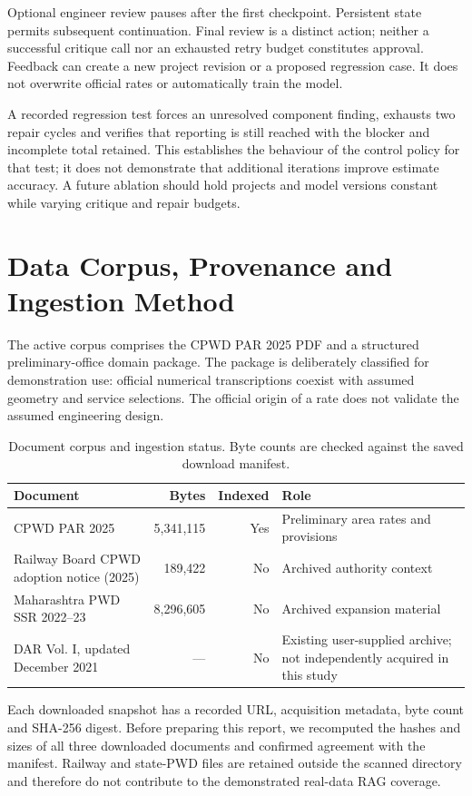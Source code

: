 \documentclass[11pt,a4paper]{article}
\begin{document}
Optional engineer review pauses after the first checkpoint. Persistent state permits subsequent continuation. Final review is a distinct action; neither a successful critique call nor an exhausted retry budget constitutes approval. Feedback can create a new project revision or a proposed regression case. It does not overwrite official rates or automatically train the model.

A recorded regression test forces an unresolved component finding, exhausts two repair cycles and verifies that reporting is still reached with the blocker and incomplete total retained. This establishes the behaviour of the control policy for that test; it does not demonstrate that additional iterations improve estimate accuracy. A future ablation should hold projects and model versions constant while varying critique and repair budgets.

\section{Data Corpus, Provenance and Ingestion Method}
The active corpus comprises the CPWD PAR 2025 PDF and a structured preliminary-office domain package. The package is deliberately classified for demonstration use: official numerical transcriptions coexist with assumed geometry and service selections. The official origin of a rate does not validate the assumed engineering design.

\begin{table}[H]\caption{Document corpus and ingestion status. Byte counts are checked against the saved download manifest.}\small
\begin{tabularx}{\linewidth}{Xrrp{.24\linewidth}}\toprule
Document & Bytes & Indexed & Role \\\midrule
CPWD PAR 2025 & 5,341,115 & Yes & Preliminary area rates and provisions \\
Railway Board CPWD adoption notice (2025) & 189,422 & No & Archived authority context \\
Maharashtra PWD SSR 2022--23 & 8,296,605 & No & Archived expansion material \\
DAR Vol. I, updated December 2021 & --- & No & Existing user-supplied archive; not independently acquired in this study \\\bottomrule
\end{tabularx}\end{table}

Each downloaded snapshot has a recorded URL, acquisition metadata, byte count and SHA-256 digest. Before preparing this report, we recomputed the hashes and sizes of all three downloaded documents and confirmed agreement with the manifest. Railway and state-PWD files are retained outside the scanned directory and therefore do not contribute to the demonstrated real-data RAG coverage.
\end{document}
